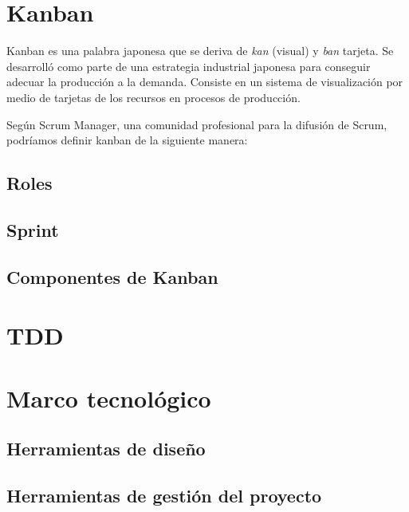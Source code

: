 \section{Kanban}
Kanban es una palabra japonesa que se deriva de \textit{kan} (visual) y \textit{ban} tarjeta. Se desarrolló como parte de una estrategia industrial japonesa para conseguir adecuar la producción a la demanda. Consiste en un sistema de visualización por medio de tarjetas de los recursos en procesos de producción.

Según Scrum Manager, una comunidad profesional para la difusión de Scrum, podríamos definir kanban \cite{Pal15} de la siguiente manera:



	\subsection{Roles}
	
	\subsection{Sprint}
	
	\subsection{Componentes de Kanban}

\section{TDD}

\section{Marco tecnológico}

	\subsection{Herramientas de diseño}
	
	\subsection{Herramientas de gestión del proyecto}
	
